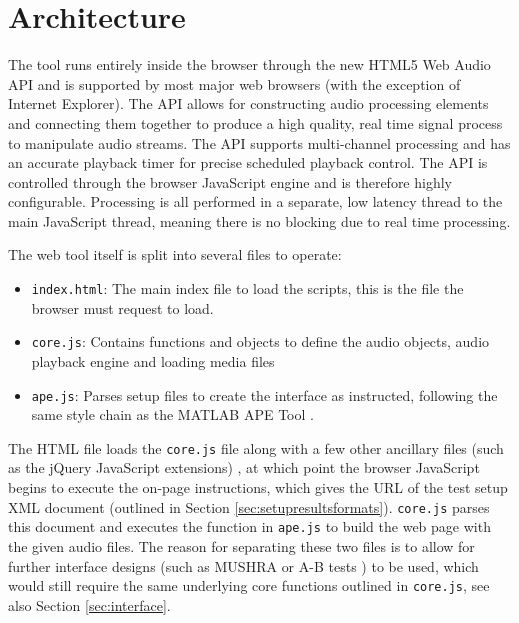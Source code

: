 \documentclass{article}
\begin{document}
\section{Architecture}\label{sec:architecture} %

The tool runs entirely inside the browser through the new HTML5 Web Audio API and is supported by most major web browsers (with the exception of Internet Explorer). The API allows for constructing audio processing elements and connecting them together to produce a high quality, real time signal process to manipulate audio streams. The API supports multi-channel processing and has an accurate playback timer for precise scheduled playback control. The API is controlled through the browser JavaScript engine and is therefore highly configurable. Processing is all performed in a separate, low latency thread to the main JavaScript thread, meaning there is no blocking due to real time processing. 

The web tool itself is split into several files to operate:
\begin{itemize}
\item \texttt{index.html}: The main index file to load the scripts, this is the file the browser must request to load.
\item \texttt{core.js}: Contains functions and objects to define the audio objects, audio playback engine and loading media files
\item \texttt{ape.js}: Parses setup files to create the interface as instructed, following the same style chain as the MATLAB APE Tool \cite{deman2014b}.
\end{itemize}

The HTML file loads the \texttt{core.js} file along with a few other ancillary files (such as the jQuery JavaScript extensions)%
, at which point the browser JavaScript begins to execute the on-page instructions, which gives the URL of the test setup XML document (outlined in Section \ref{sec:setupresultsformats}). \texttt{core.js} parses this document and executes the function in \texttt{ape.js} to build the web page with the given audio files. The reason for separating these two files is to allow for further interface designs (such as MUSHRA \cite{mushra} or A-B tests \cite{bech}) to be used, which would still require the same underlying core functions outlined in \texttt{core.js}, see also Section \ref{sec:interface}.
\end{document}
